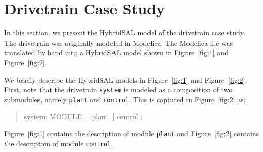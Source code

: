 \documentclass{llncs}
\begin{document}
\section{Drivetrain Case Study}

In this section, we present the HybridSAL model of the drivetrain case study.
The drivetrain was originally modeled in Modelica. 
The Modelica file was translated by hand into a HybridSAL model
shown in Figure~\ref{fig:1} and Figure~\ref{fig:2}.

We briefly describe the
HybridSAL models in Figure~\ref{fig:1} and Figure~\ref{fig:2}.
First, note that the drivetrain {\tt{system}} is modeled as a composition
of two submodules, namely {\tt{plant}} and {\tt{control}}.
This is captured in Figure~\ref{fig:2} as:
\begin{quote}
\begin{tt}
system: MODULE  = plant || control ;
\end{tt}
\end{quote}
Figure~\ref{fig:1} contains the description of module {\tt{plant}}
and 
Figure~\ref{fig:2} contains the description of module {\tt{control}}.
\end{document}
